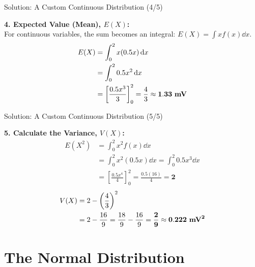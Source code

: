 \begin{frame}{Solution: A Custom Continuous Distribution (4/5)}
    \begin{solutioncont}
        \textbf{4. Expected Value (Mean), $E(X)$:} \\
        For continuous variables, the sum becomes an integral: $E(X) = \int x f(x) \dd x$.
        \begin{align*}
            E(X) &= \int_{0}^{2} x (0.5x) \,\mathrm{d} x \\
                 &= \int_{0}^{2} 0.5x^2 \,\mathrm{d} x \\
                 &= \left[ \frac{0.5x^3}{3} \right]_{0}^{2} = \frac{4}{3} \approx \mathbf{1.33\text{ \textbf{mV}}}
        \end{align*}
    \end{solutioncont}
\end{frame}

\begin{frame}[plain]{Solution: A Custom Continuous Distribution (5/5)}
    \begin{solutioncont}
        \textbf{5. Calculate the Variance, $V(X)$:} 
        \begin{align*}
            E(X^2) &= \int_{0}^{2} x^2 f(x) \dd x \\
                   &= \int_{0}^{2} x^2 (0.5x) \dd x = \int_{0}^{2} 0.5x^3 \dd x \\
                   &= \left[ \frac{0.5x^4}{4} \right]_{0}^{2} = \frac{0.5(16)}{4} = \mathbf{2}
        \end{align*}
        \vspace{-5mm}
        \begin{align*}
            V(X) &= 2 - \left(\frac{4}{3}\right)^2 \\
                 &= 2 - \frac{16}{9} = \frac{18}{9} - \frac{16}{9} = \mathbf{\frac{2}{9}} \approx \mathbf{0.222\text{ \textbf{mV}}^2}
        \end{align*}
    \end{solutioncont}
\end{frame}

\section{The Normal Distribution}
